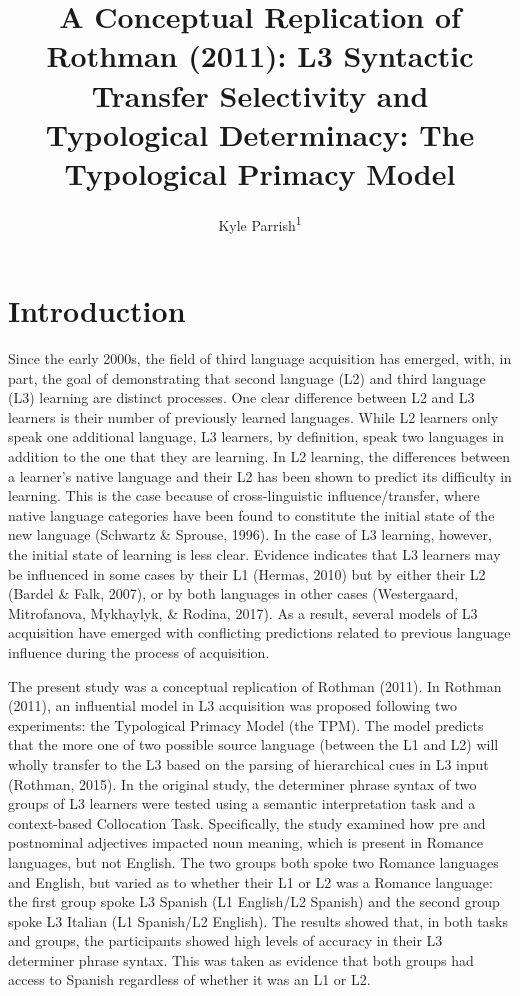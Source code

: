 \documentclass[
  man]{apa6}
\title{A Conceptual Replication of Rothman (2011): L3 Syntactic Transfer Selectivity and Typological Determinacy: The Typological Primacy Model}
\author{Kyle Parrish\textsuperscript{1}}
\date{}
\affiliation{\vspace{0.5cm}\textsuperscript{1} Rutgers University}
\begin{document}
\maketitle

\hypertarget{introduction}{%
\section{Introduction}\label{introduction}}

Since the early 2000s, the field of third language acquisition has emerged, with, in part, the goal of demonstrating that second language (L2) and third language (L3) learning are distinct processes.
One clear difference between L2 and L3 learners is their number of previously learned languages.
While L2 learners only speak one additional language, L3 learners, by definition, speak two languages in addition to the one that they are learning.
In L2 learning, the differences between a learner's native language and their L2 has been shown to predict its difficulty in learning.
This is the case because of cross-linguistic influence/transfer, where native language categories have been found to constitute the initial state of the new language (Schwartz \& Sprouse, 1996).
In the case of L3 learning, however, the initial state of learning is less clear.
Evidence indicates that L3 learners may be influenced in some cases by their L1 (Hermas, 2010) but by either their L2 (Bardel \& Falk, 2007), or by both languages in other cases (Westergaard, Mitrofanova, Mykhaylyk, \& Rodina, 2017).
As a result, several models of L3 acquisition have emerged with conflicting predictions related to previous language influence during the process of acquisition.

The present study was a conceptual replication of Rothman (2011).
In Rothman (2011), an influential model in L3 acquisition was proposed following two experiments: the Typological Primacy Model (the TPM).
The model predicts that the more one of two possible source language (between the L1 and L2) will wholly transfer to the L3 based on the parsing of hierarchical cues in L3 input (Rothman, 2015).
In the original study, the determiner phrase syntax of two groups of L3 learners were tested using a semantic interpretation task and a context-based Collocation Task.
Specifically, the study examined how pre and postnominal adjectives impacted noun meaning, which is present in Romance languages, but not English.
The two groups both spoke two Romance languages and English, but varied as to whether their L1 or L2 was a Romance language: the first group spoke L3 Spanish (L1 English/L2 Spanish) and the second group spoke L3 Italian (L1 Spanish/L2 English).
The results showed that, in both tasks and groups, the participants showed high levels of accuracy in their L3 determiner phrase syntax.
This was taken as evidence that both groups had access to Spanish regardless of whether it was an L1 or L2.
\end{document}
